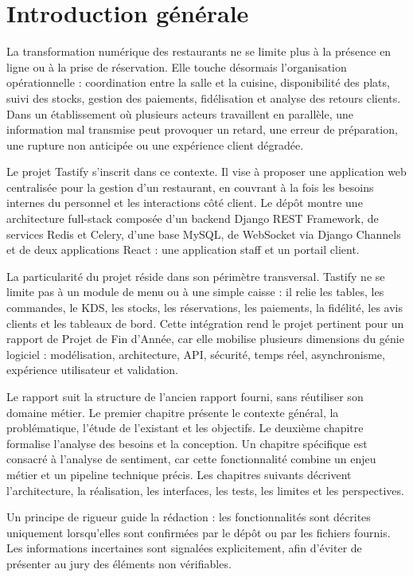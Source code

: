 \chapter*{Introduction générale}

La transformation numérique des restaurants ne se limite plus à la présence en ligne ou à la prise de réservation. Elle touche désormais l'organisation opérationnelle : coordination entre la salle et la cuisine, disponibilité des plats, suivi des stocks, gestion des paiements, fidélisation et analyse des retours clients. Dans un établissement où plusieurs acteurs travaillent en parallèle, une information mal transmise peut provoquer un retard, une erreur de préparation, une rupture non anticipée ou une expérience client dégradée.

Le projet Tastify s'inscrit dans ce contexte. Il vise à proposer une application web centralisée pour la gestion d'un restaurant, en couvrant à la fois les besoins internes du personnel et les interactions côté client. Le dépôt montre une architecture full-stack composée d'un backend Django REST Framework, de services Redis et Celery, d'une base MySQL, de WebSocket via Django Channels et de deux applications React : une application staff et un portail client.

La particularité du projet réside dans son périmètre transversal. Tastify ne se limite pas à un module de menu ou à une simple caisse : il relie les tables, les commandes, le KDS, les stocks, les réservations, les paiements, la fidélité, les avis clients et les tableaux de bord. Cette intégration rend le projet pertinent pour un rapport de Projet de Fin d'Année, car elle mobilise plusieurs dimensions du génie logiciel : modélisation, architecture, API, sécurité, temps réel, asynchronisme, expérience utilisateur et validation.

Le rapport suit la structure de l'ancien rapport fourni, sans réutiliser son domaine métier. Le premier chapitre présente le contexte général, la problématique, l'étude de l'existant et les objectifs. Le deuxième chapitre formalise l'analyse des besoins et la conception. Un chapitre spécifique est consacré à l'analyse de sentiment, car cette fonctionnalité combine un enjeu métier et un pipeline technique précis. Les chapitres suivants décrivent l'architecture, la réalisation, les interfaces, les tests, les limites et les perspectives.

Un principe de rigueur guide la rédaction : les fonctionnalités sont décrites uniquement lorsqu'elles sont confirmées par le dépôt ou par les fichiers fournis. Les informations incertaines sont signalées explicitement, afin d'éviter de présenter au jury des éléments non vérifiables.
